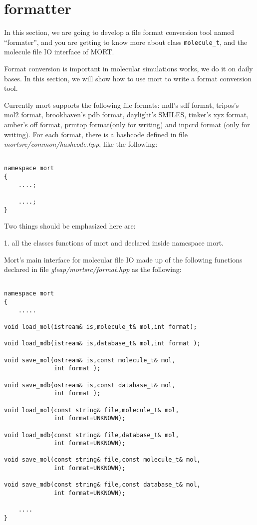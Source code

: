 \documentclass[letterpaper]{book}
\begin{document}
\section{formatter}
  In this section, we are going to develop a file format conversion tool named ``formater'',
and you are getting to know more about class \lstinline$molecule_t$, and the molecule file 
IO interface of MORT.

  Format conversion is important in molecular simulations works, we do it on daily bases. 
In this section, we will show how to use mort to write a format conversion tool.

  Currently mort supports the following file formats: mdl's sdf format, tripos's mol2 format, 
brookhaven's pdb format, daylight's SMILES, tinker's xyz format, amber's off format, prmtop 
format(only for writing) and inpcrd format (only for writing). For each format, there is a
hashcode defined in file {\it mortsrc/common/hashcode.hpp}, like the following:

\begin{lstlisting}

namespace mort
{
    ....;

    ....;
}

\end{lstlisting}

Two things should be emphasized here are:


1. all the classes functions of mort and declared inside namespace mort. 

Mort's main interface for molecular file IO made up of the following functions declared in file 
{\it gleap/mortsrc/format.hpp} as the following:

\begin{lstlisting}

namespace mort
{
    .....

void load_mol(istream& is,molecule_t& mol,int format);

void load_mdb(istream& is,database_t& mol,int format );

void save_mol(ostream& is,const molecule_t& mol,
              int format );

void save_mdb(ostream& is,const database_t& mol,
              int format );

void load_mol(const string& file,molecule_t& mol,
              int format=UNKNOWN);

void load_mdb(const string& file,database_t& mol,
              int format=UNKNOWN);

void save_mol(const string& file,const molecule_t& mol,
              int format=UNKNOWN);

void save_mdb(const string& file,const database_t& mol,
              int format=UNKNOWN);

    ....
}

\end{lstlisting}
\end{document}
